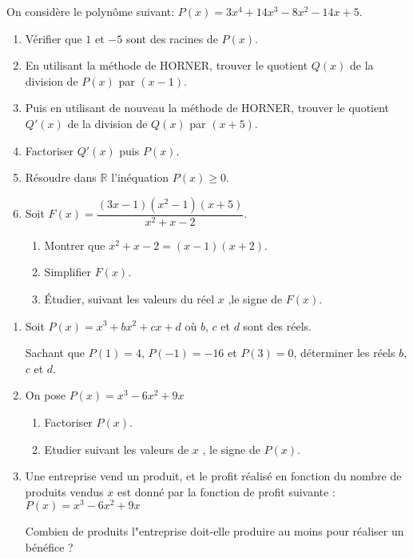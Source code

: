 \begin{exercice}
On considère le polynôme  suivant:\; $ P(x)=3x^4+14x^3-8x^2-14x+5 $.
\begin{enumerate}
\item Vérifier que  $ 1 $  et $ -5 $ sont des racines de  $ P(x)$. 
\item En utilisant  la méthode de HORNER, trouver le quotient $ Q(x)$ de la division de $ P(x)$ par $ (x-1) $.


\item Puis en utilisant  de nouveau  la méthode de HORNER, trouver le quotient $ Q'(x)$ de la division de $ Q(x)$ par $ (x+5) $.

\item Factoriser    $ Q'(x)$ puis $ P(x)$.
\item Résoudre dans $ \mathbb{R} $ l'inéquation \; $ P(x)\geq 0 $.

\item Soit\;  $ F(x)=\dfrac{(3x-1)(x^2-1)(x+5)}{x^2+x-2} $.


\begin{enumerate}
\item Montrer que \; $x^2+x-2=(x-1)(x+2)$. 


\item Simplifier \; $  F(x) $. 


\item   Étudier, suivant les valeurs du réel $ x $ ,le signe de $ F(x)$.  
\end{enumerate}
\end{enumerate}

\end{exercice}
\begin{exercice}

\begin{enumerate}
\item  
 Soit $ P(x)= x^3+bx^2+c x+d $ où $ b $, $c $ et $ d$ sont des réels.
 
  Sachant que $ P(1)=4 $,\;  $ P(-1)=-16 $ \;et \;  $ P(3)=0 $, déterminer les réels $ b $, $c $ et $ d$. 
\item On pose \; $ P(x)=x^3-6x^2+9x $
\begin{enumerate}
\item Factoriser $ P(x) $.
\item Etudier suivant les valeurs de $ x $ , le signe de $ P(x) $.
\end{enumerate}
\item Une entreprise vend un produit, et le profit réalisé en fonction du nombre de produits vendus 
$ x $ est donné par la fonction de profit suivante :
\; $P(x)=x^3-6x^2+9x$

Combien de produits l"entreprise doit-elle produire au moins pour réaliser un bénéfice ?
\end{enumerate}
\end{exercice}



